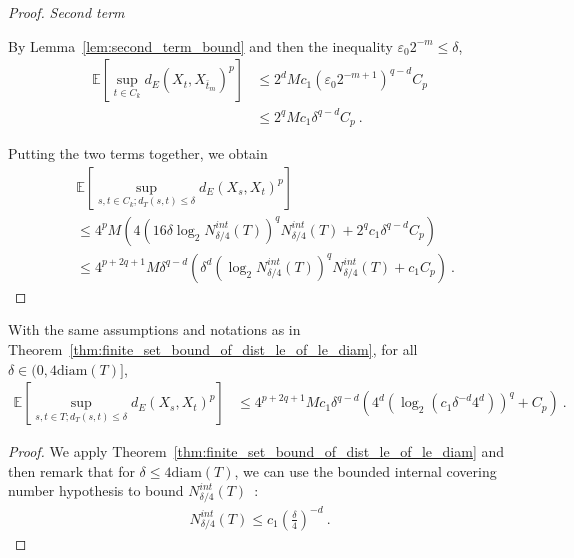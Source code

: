 \begin{proof}
\emph{Second term}

By Lemma~\ref{lem:second_term_bound} and then the inequality $\varepsilon_0 2^{-m} \le \delta$,
\begin{align*}
  \mathbb{E} \left[\sup_{t \in C_k} d_E(X_t, X_{\bar{t}_m})^p \right]
  &\le 2^d M c_1 (\varepsilon_0 2^{-m+1})^{q - d} C_p
  \\
  &\le 2^q M c_1 \delta^{q - d} C_p
  \: .
\end{align*}

Putting the two terms together, we obtain
\begin{align*}
  &\mathbb{E}\left[ \sup_{s, t \in C_k; d_T(s, t) \le \delta} d_E(X_s, X_t)^p \right]
  \\
  &\le 4^p M \left(4\left(16 \delta \log_2 N^{int}_{\delta/4}(T) \right)^q  N^{int}_{\delta/4}(T)
    + 2^q c_1 \delta^{q - d} C_p\right)
  \\
  &\le 4^{p+2q+1} M \delta^{q-d} \left(\delta^d \left(\log_2 N^{int}_{\delta/4}(T) \right)^q  N^{int}_{\delta/4}(T)
    + c_1 C_p\right)
  \: .
\end{align*}
\end{proof}


\begin{corollary}\label{cor:finite_set_bound_of_dist_le_of_le_diam_bis}
  \leanok
With the same assumptions and notations as in Theorem~\ref{thm:finite_set_bound_of_dist_le_of_le_diam}, for all $\delta \in (0, 4\mathrm{diam}(T)]$,
\begin{align*}
  \mathbb{E}\left[ \sup_{s, t \in T; d_T(s, t) \le \delta} d_E(X_s, X_t)^p \right]
  &\le 4^{p+2q+1} M c_1 \delta^{q-d} \left(4^d \left(\log_2 \left(c_1 \delta^{-d} 4^d \right) \right)^q
    + C_p\right)
  \: .
\end{align*}
\end{corollary}

\begin{proof}\leanok
We apply Theorem~\ref{thm:finite_set_bound_of_dist_le_of_le_diam} and then remark that for $\delta \le 4\mathrm{diam}(T)$, we can use the bounded internal covering number hypothesis to bound $N^{int}_{\delta/4}(T)$~:
\begin{align*}
  N^{int}_{\delta/4}(T) \le c_1 \left(\frac{\delta}{4}\right)^{-d} \: .
\end{align*}
\end{proof}


